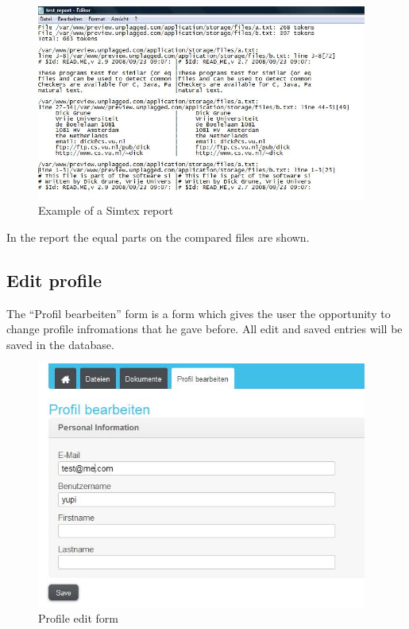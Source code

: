 \begin{figure}[!ht]
  \centering
    \includegraphics[width=0.97\textwidth]{images/basic_functionalities/simtext_report.jpg}
  \caption{Example of a Simtex report}
  \label{fig:e.g. simtex report}
\end{figure}

In the report the equal parts on the compared files are shown.

\subsection{Edit profile}

The \enquote{Profil bearbeiten} form is a form which gives the user the opportunity to change profile infromations that 
he gave before. All edit and saved entries will be saved in the database.

\begin{figure}[!ht]
  \centering
    \includegraphics[width=0.97\textwidth]{images/basic_functionalities/edit_profile.jpg}
  \caption{Profile edit form}
  \label{fig: profile edit form}
\end{figure}

